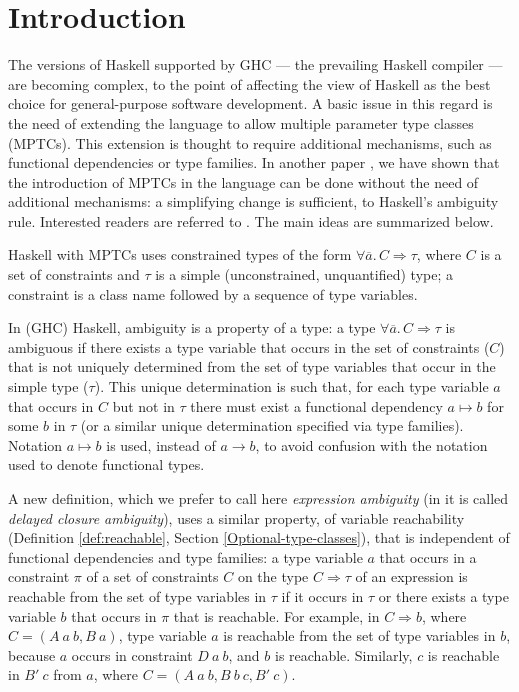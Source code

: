\section{Introduction}
\label{sec:intro}

The versions of Haskell supported by GHC \cite{GHC} --- the prevailing
Haskell compiler --- are becoming complex, to the point of affecting
the view of Haskell as the best choice for general-purpose software
development. A basic issue in this regard is the need of extending the
language to allow multiple parameter type classes (MPTCs). This
extension is thought to require additional mechanisms, such as
functional dependencies or type families. In another paper
\cite{JBCS-Ambiguity-and-constrained-polymorphism}, we have shown that
the introduction of MPTCs in the language can be done without the need
of additional mechanisms: a simplifying change is sufficient, to
Haskell's ambiguity rule. Interested readers are referred to
\cite{JBCS-Ambiguity-and-constrained-polymorphism}. The main ideas are
summarized below.

Haskell with MPTCs uses constrained types of the form $\forall
\overline{a}.\,C \Rightarrow \tau$, where $C$ is a set of constraints
and $\tau$ is a simple (unconstrained, unquantified) type; a
constraint is a class name followed by a sequence of type variables.

In (GHC) Haskell, ambiguity is a property of a type: a type $\forall
\overline{a}.\,C \Rightarrow \tau$ is ambiguous if there exists a type
variable that occurs in the set of constraints ($C$) that is not
uniquely determined from the set of type variables that occur in the
simple type ($\tau$). This unique determination is such that, for each
type variable $a$ that occurs in $C$ but not in $\tau$ there must
exist a functional dependency $a \mapsto b$ for some $b$ in $\tau$ (or
a similar unique determination specified via type families). Notation
$a \mapsto b$ is used, instead of $a \rightarrow b$, to avoid
confusion with the notation used to denote functional types.

A new definition, which we prefer to call here {\em expression
  ambiguity\/} (in \cite{JBCS-Ambiguity-and-constrained-polymorphism}
it is called {\em delayed closure ambiguity\/}), uses a similar
property, of variable reachability (Definition \ref{def:reachable},
Section \ref{Optional-type-classes}), that is independent of
functional dependencies and type families: a type variable $a$ that
occurs in a constraint $\pi$ of a set of constraints $C$ on the type
$C\Rightarrow\tau$ of an expression is reachable from the set of type
variables in $\tau$ if it occurs in $\tau$ or there exists a type
variable $b$ that occurs in $\pi$ that is reachable. For example, in
$C \Rightarrow b$, where $C=(A\: a\: b, B\: a)$, type variable $a$ is
reachable from the set of type variables in $b$, because $a$ occurs in
constraint $D\: a\: b$, and $b$ is reachable. Similarly, $c$ is
reachable in $B'\: c$ from $a$, where $C=(A\: a\: b, B\: b\: c, B'\: c)$.

